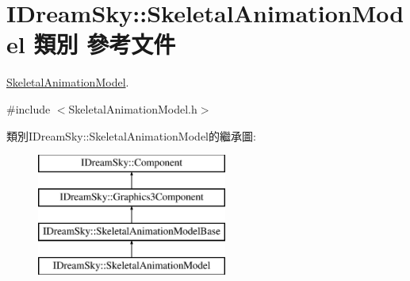 \hypertarget{class_i_dream_sky_1_1_skeletal_animation_model}{}\section{I\+Dream\+Sky\+:\+:Skeletal\+Animation\+Model 類別 參考文件}
\label{class_i_dream_sky_1_1_skeletal_animation_model}


\hyperlink{class_i_dream_sky_1_1_skeletal_animation_model}{Skeletal\+Animation\+Model}.  




{\ttfamily \#include $<$Skeletal\+Animation\+Model.\+h$>$}

類別\+I\+Dream\+Sky\+:\+:Skeletal\+Animation\+Model的繼承圖\+:\begin{figure}[H]
\begin{center}
\leavevmode
\includegraphics[height=4.000000cm]{class_i_dream_sky_1_1_skeletal_animation_model}
\end{center}
\end{figure}
